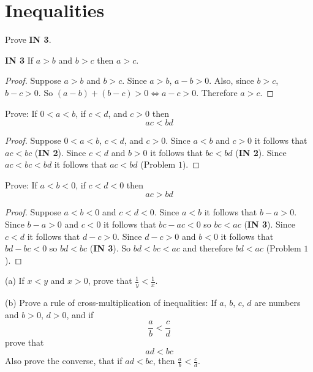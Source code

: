 \documentclass[6pt]{article}
\begin{document}
\section{Inequalities}

\begin{tcolorbox}[title=Problem 1, breakable]
    Prove \textbf{IN 3}.
\end{tcolorbox}

\textbf{IN 3} If $a > b$ and $b > c$ then $a > c$.

\begin{proof}
    Suppose $a > b$ and $b > c$.
    Since $a > b$, $a - b > 0$.
    Also, since $b > c$, $b - c > 0$.
    So $(a - b) + (b - c) > 0 \iff a - c > 0$.
    Therefore $a > c$.
\end{proof}

\begin{tcolorbox}[title=Problem 2, breakable]
    Prove: If $0 < a < b$, if $c < d$, and $c > 0$ then
    \[ac < bd\]
\end{tcolorbox}

\begin{proof}
    Suppose $0 < a < b$, $c < d$, and $c > 0$.
    Since $a < b$ and $c > 0$ it follows that $ac < bc$ (\textbf{IN 2}).
    Since $c < d$ and  $b > 0$ it follows that $bc < bd$ (\textbf{IN 2}).
    Since $ac < bc < bd$ it follows that $ac < bd$ (Problem $1$).
\end{proof}

\begin{tcolorbox}[title=Problem 3, breakable]
    Prove: If $a < b < 0$, if $c < d < 0$ then 
    \[ac > bd\]
\end{tcolorbox}

\begin{proof}
    Suppose $a < b < 0$ and $c < d < 0$.
    Since $a < b$ it follows that $b - a > 0$.
    Since $b - a > 0$ and $c < 0$ it follows that $bc - ac < 0$ so $bc < ac$ (\textbf{IN 3}).
    Since $c < d$ it follows that $d - c > 0$.
    Since $d - c > 0$ and $b < 0$ it follows that $bd - bc < 0$ so $bd < bc$ (\textbf{IN 3}).
    So $bd < bc < ac$ and therefore $bd < ac$ (Problem $1$).
\end{proof}

\begin{tcolorbox}[title=Problem 4, breakable]
    (a) If $x < y$ and $x > 0$, prove that $\frac{1}{y} < \frac{1}{x}$.

    (b) Prove a rule of cross-multiplication of inequalities: If $a$, $b$, $c$, $d$
    are numbers and $b > 0$, $d > 0$, and if 
    \[\frac{a}{b} < \frac{c}{d}\]
    prove that 
    \[ad < bc\]
    Also prove the converse, that if $ad < bc$, then $\frac{a}{b} < \frac{c}{d}$.
\end{tcolorbox}
\end{document}
